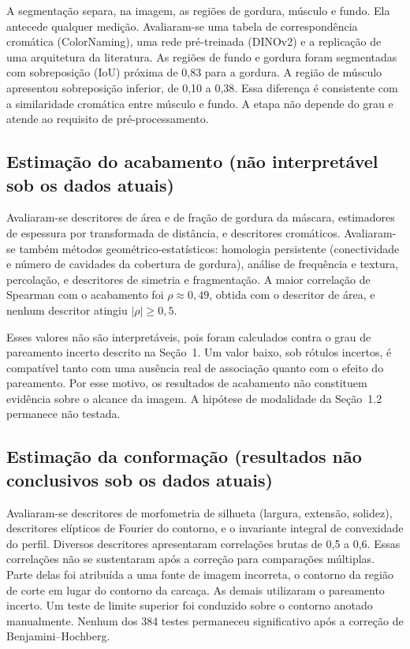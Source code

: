 \documentclass[12pt,a4paper]{article}
\begin{document}
A segmentação separa, na imagem, as regiões de gordura, músculo e fundo. Ela antecede
qualquer medição. Avaliaram-se uma tabela de correspondência cromática (ColorNaming),
uma rede pré-treinada (DINOv2) e a replicação de uma arquitetura da literatura. As
regiões de fundo e gordura foram segmentadas com sobreposição (IoU) próxima de 0,83 para
a gordura. A região de músculo apresentou sobreposição inferior, de 0,10 a 0,38. Essa
diferença é consistente com a similaridade cromática entre músculo e fundo. A etapa não
depende do grau e atende ao requisito de pré-processamento.

\subsection{Estimação do acabamento (não interpretável sob os dados atuais)}

Avaliaram-se descritores de área e de fração de gordura da máscara, estimadores de
espessura por transformada de distância, e descritores cromáticos. Avaliaram-se também
métodos geométrico-estatísticos: homologia persistente (conectividade e número de
cavidades da cobertura de gordura), análise de frequência e textura, percolação, e
descritores de simetria e fragmentação. A maior correlação de Spearman com o acabamento
foi $\rho \approx 0{,}49$, obtida com o descritor de área, e nenhum descritor atingiu
$|\rho| \geq 0{,}5$.

Esses valores não são interpretáveis, pois foram calculados contra o grau de pareamento
incerto descrito na Seção~1. Um valor baixo, sob rótulos incertos, é compatível tanto
com uma ausência real de associação quanto com o efeito do pareamento. Por esse motivo,
os resultados de acabamento não constituem evidência sobre o alcance da imagem. A
hipótese de modalidade da Seção~1.2 permanece não testada.

\subsection{Estimação da conformação (resultados não conclusivos sob os dados atuais)}

Avaliaram-se descritores de morfometria de silhueta (largura, extensão, solidez),
descritores elípticos de Fourier do contorno, e o invariante integral de convexidade do
perfil. Diversos descritores apresentaram correlações brutas de 0,5 a 0,6. Essas
correlações não se sustentaram após a correção para comparações múltiplas. Parte delas
foi atribuída a uma fonte de imagem incorreta, o contorno da região de corte em lugar do
contorno da carcaça. As demais utilizaram o pareamento incerto. Um teste de limite
superior foi conduzido sobre o contorno anotado manualmente. Nenhum dos 384 testes
permaneceu significativo após a correção de Benjamini--Hochberg.
\end{document}
